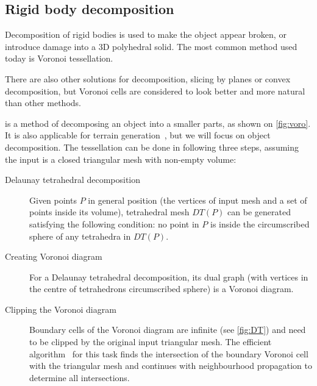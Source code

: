 \subsection{Rigid body decomposition}

Decomposition of rigid bodies is used to make the object appear broken, or introduce damage into a 3D polyhedral solid. The most common method used today is Voronoi tessellation.

There are also other solutions for decomposition, \eg slicing by planes or convex decomposition, but Voronoi cells are considered to look better and more natural than other methods. 

 is a method of decomposing an object into a smaller parts, as shown on \cref{fig:voro}. It is also applicable for \eg terrain generation~\cite{voronoiterrainrealtime}, but we will focus on object decomposition. The tessellation can be done in following three steps, assuming the input is a closed triangular mesh with non-empty volume:
\begin{description}
    \item[Delaunay tetrahedral decomposition] Given points $P$ in general position (the vertices of input mesh and a set of points inside its volume), tetrahedral mesh $DT(P)$ can be generated satisfying the following condition: no point in $P$ is inside the circumscribed sphere of any tetrahedra in $DT(P)$.
    \item[Creating Voronoi diagram] For a Delaunay tetrahedral decomposition, its dual graph (with vertices in the centre of tetrahedrons circumscribed sphere) is a Voronoi diagram.
    \item[Clipping the Voronoi diagram] Boundary cells of the Voronoi diagram are infinite (see \cref{fig:DT}) and need to be clipped by the original input triangular mesh. The efficient algorithm~\cite{yan2010efficient} for this task finds the intersection of the boundary Voronoi cell with the triangular mesh and continues with neighbourhood propagation to determine all intersections. 
\end{description}


